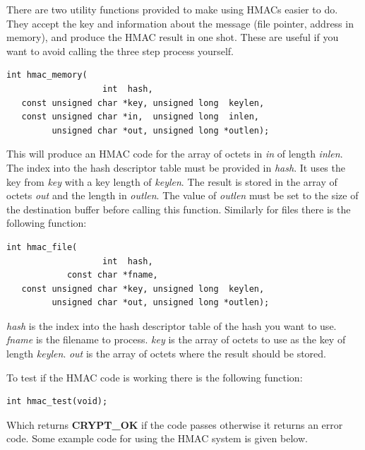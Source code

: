\documentclass[synpaper]{book}
\begin{document}
There are two utility functions provided to make using HMACs easier to do.  They accept the key and information about the
message (file pointer, address in memory), and produce the HMAC result in one shot.  These are useful if you want to avoid
calling the three step process yourself.

\begin{verbatim}
int hmac_memory(
                   int  hash,
   const unsigned char *key, unsigned long  keylen,
   const unsigned char *in,  unsigned long  inlen,
         unsigned char *out, unsigned long *outlen);
\end{verbatim}
This will produce an HMAC code for the array of octets in \textit{in} of length \textit{inlen}.  The index into the hash descriptor
table must be provided in \textit{hash}.  It uses the key from \textit{key} with a key length of \textit{keylen}.
The result is stored in the array of octets \textit{out} and the length in \textit{outlen}.  The value of \textit{outlen} must be set
to the size of the destination buffer before calling this function.  Similarly for files there is the  following function:
\begin{verbatim}
int hmac_file(
                   int  hash,
            const char *fname,
   const unsigned char *key, unsigned long  keylen,
         unsigned char *out, unsigned long *outlen);
\end{verbatim}
\textit{hash} is the index into the hash descriptor table of the hash you want to use.  \textit{fname} is the filename to process.
\textit{key} is the array of octets to use as the key of length \textit{keylen}.  \textit{out} is the array of octets where the
result should be stored.

To test if the HMAC code is working there is the following function:
\begin{verbatim}
int hmac_test(void);
\end{verbatim}
Which returns {\bf CRYPT\_OK} if the code passes otherwise it returns an error code.  Some example code for using the
HMAC system is given below.
\end{document}
